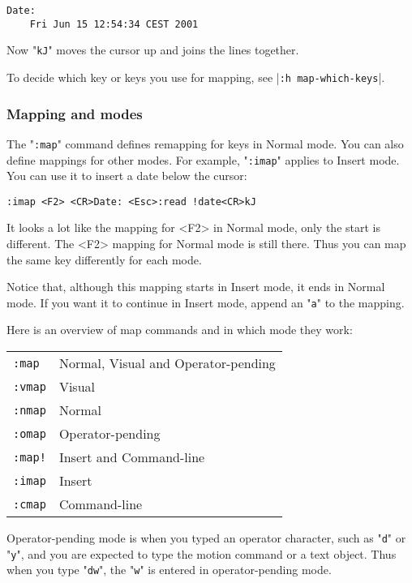 \begin{Verbatim}[samepage=true]
    Date:  
    Fri Jun 15 12:54:34 CEST 2001 
\end{Verbatim}

Now "\texttt{kJ}" moves the cursor up and joins the lines together.

To decide which key or keys you use for mapping, see |\texttt{:h map-which-keys}|.

\subsubsection{Mapping and modes}
The "\texttt{:map}" command defines remapping for keys in Normal mode.
You can also define mappings for other modes.
For example, "\texttt{:imap}" applies to Insert mode.
You can use it to insert a date below the cursor:

\begin{Verbatim}[samepage=true]
 :imap <F2> <CR>Date: <Esc>:read !date<CR>kJ
\end{Verbatim}

It looks a lot like the mapping for <F2> in Normal mode, only the start is different.
The <F2> mapping for Normal mode is still there.
Thus you can map the same key differently for each mode.

Notice that, although this mapping starts in Insert mode, it ends in Normal mode.
If you want it to continue in Insert mode, append an "\texttt{a}" to the mapping.

Here is an overview of map commands and in which mode they work:
\begin{center} \begin{tabular}{l l}
				\texttt{:map} & Normal, Visual and Operator-pending \\
				\texttt{:vmap} & Visual \\
				\texttt{:nmap} & Normal \\
				\texttt{:omap} & Operator-pending \\
				\texttt{:map!} & Insert and Command-line \\
				\texttt{:imap} & Insert \\
				\texttt{:cmap} & Command-line \\
\end{tabular} \end{center}

Operator-pending mode is when you typed an operator character, such as "\texttt{d}" or "\texttt{y}", and you are expected to type the motion command or a text object.
Thus when you type "\texttt{dw}", the "\texttt{w}" is entered in operator-pending mode.

